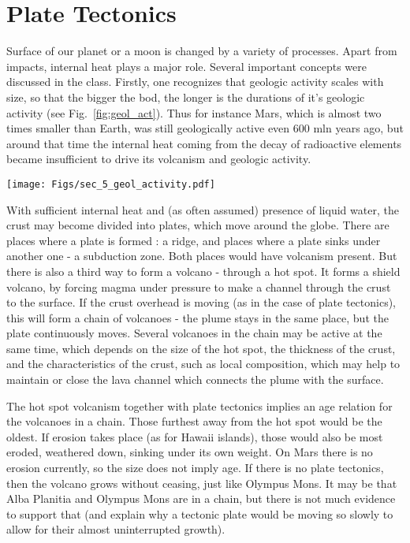 \documentclass[paper=a4, fontsize=11pt]{scrartcl} %
\numberwithin{equation}{section} %
\begin{document}
\section{Plate Tectonics}

Surface of our planet or a moon is changed by a variety of processes. Apart from impacts, internal heat plays a major role. Several important concepts were discussed in the class. Firstly, one recognizes that geologic activity scales with size, so that the bigger the bod, the longer is the durations of it's geologic activity (see Fig.~\ref{fig:geol_act}).  Thus for instance Mars, which is almost two times smaller than Earth,  was still geologically active even 600 mln years ago, but around that time the internal heat coming from the decay of radioactive elements became insufficient to drive its  volcanism and geologic activity. 


\begin{figure*}
\centering
	\texttt{[image: Figs/sec\_5\_geol\_activity.pdf]}
	\caption[geol_act]{Geologic activity scales with size}
	\label{fig:geol_act}
\end{figure*}  

With sufficient internal heat and (as often assumed) presence of liquid water, the crust may become divided into plates, which move around the globe. There are places where a plate is formed : a ridge, and places where a plate sinks under another one  - a subduction zone. Both places would have volcanism present. But there is also a third way to form a volcano - through a hot spot. It forms a shield volcano, by forcing magma under pressure to make a channel through the crust to the surface.    If the crust  overhead is moving (as in the case of plate tectonics), this will form a chain of volcanoes - the plume stays in the same place, but the plate continuously moves.  Several volcanoes in the chain may be active at the same time,  which depends on the size of the hot spot, the thickness of the crust, and the characteristics of the crust, such as local composition, which may help to maintain or close the lava channel which connects the plume with the surface.  

The hot spot volcanism together with plate tectonics implies an age relation for the volcanoes in a chain. Those furthest away from the hot spot would be the oldest. If erosion takes place (as for Hawaii islands), those would also be most eroded, weathered down, sinking under its own weight.  On Mars there is no erosion currently, so the size does not imply age.  If there is no plate tectonics,  then the volcano grows without ceasing, just like Olympus Mons. It may be that Alba Planitia and Olympus Mons are in a chain, but there is not much evidence to support that (and explain why a tectonic plate would be moving so slowly to allow for their almost uninterrupted growth). 
\end{document}
